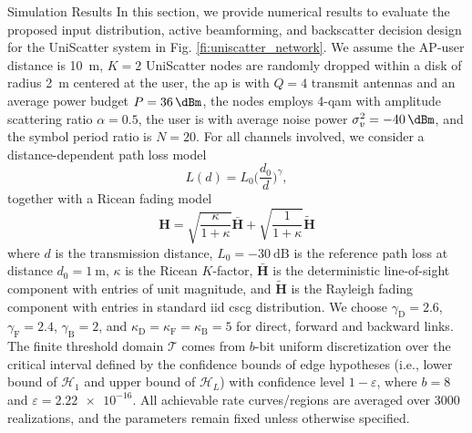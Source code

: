 \documentclass[journal]{IEEEtran}
\begin{document}
\begin{section}{Simulation Results}
	In this section, we provide numerical results to evaluate the proposed input distribution, active beamforming, and backscatter decision design for the UniScatter system in Fig. \ref{fi:uniscatter_network}.
	We assume the AP-user distance is \qty{10}{\meter}, $K=2$ UniScatter nodes are randomly dropped within a disk of radius \qty{2}{\meter} centered at the user, the \gls{ap} is with $Q=4$ transmit antennas and an average power budget $P=\qty{36}{\dBm}$, the nodes employs \num{4}-\gls{qam} with amplitude scattering ratio $\alpha=0.5$, the user is with average noise power $\sigma_v^2=\qty{-40}{\dBm}$, and the symbol period ratio is $N=20$.
	For all channels involved, we consider a distance-dependent path loss model
	\begin{equation}
		L(d) = L_0 \biggl(\frac{d_0}{d}\biggr)^\gamma,
	\end{equation}
	together with a Ricean fading model
	\begin{equation}
		\boldsymbol{H} = \sqrt{\frac{\kappa}{1+\kappa}} \bar{\boldsymbol{H}} + \sqrt{\frac{1}{1+\kappa}} \tilde{\boldsymbol{H}}
	\end{equation}
	where $d$ is the transmission distance, $L_0=-\qty{30}{\dB}$ is the reference path loss at distance $d_0=\qty{1}{\meter}$, $\kappa$ is the Ricean $K$-factor, $\bar{\boldsymbol{H}}$ is the deterministic line-of-sight component with entries of unit magnitude, and $\tilde{\boldsymbol{H}}$ is the Rayleigh fading component with entries in standard \gls{iid} \gls{cscg} distribution.
	We choose $\gamma_{\mathrm{D}}=2.6$, $\gamma_{\mathrm{F}}=2.4$, $\gamma_{\mathrm{B}}=2$, and $\kappa_{\mathrm{D}}=\kappa_{\mathrm{F}}=\kappa_{\mathrm{B}}=5$ for direct, forward and backward links.
	The finite threshold domain $\mathcal{T}$ comes from $b$-bit uniform discretization over the critical interval defined by the confidence bounds of edge hypotheses (i.e., lower bound of $\mathcal{H}_1$ and upper bound of $\mathcal{H}_L$) with confidence level $1-\varepsilon$, where $b=8$ and $\varepsilon=\num{2.22e-16}$.
	All achievable rate curves/regions are averaged over \num{3000} realizations, and the parameters remain fixed unless otherwise specified.


\end{section}
\end{document}
